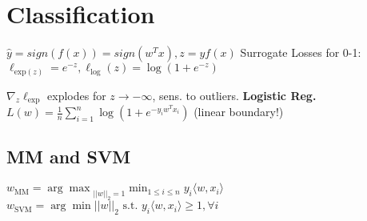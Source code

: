 \section*{Classification}
$\hat{y}=sign(f(x))=sign(w^Tx), z = yf(x)$
Surrogate Losses for 0-1: \(\ell_{\text{exp}(z)} = e^{-z}, \ell_{\text{log}}(z) = \log(1+e^{-z})\)

\(\nabla_z \ell_{\text{exp}}\) explodes for \(z \to -\infty\), sens. to outliers.
\textbf{Logistic Reg.} \(L(w) = \frac{1}{n}\sum_{i = 1}^n \log(1+e^{-y_iw^Tx_i})\)
(linear boundary!)






\subsection*{MM and SVM}
\(w_{\text{MM}} = {\arg \max}_{||w||_2=1}\min_{1\leq i \leq n} y_i \langle w, x_i \rangle\)\\
\(w_{\text{SVM}} = \arg \min||w||_2 \text{ s.t. } y_i\langle w, x_i \rangle \geq 1, \forall i\)

